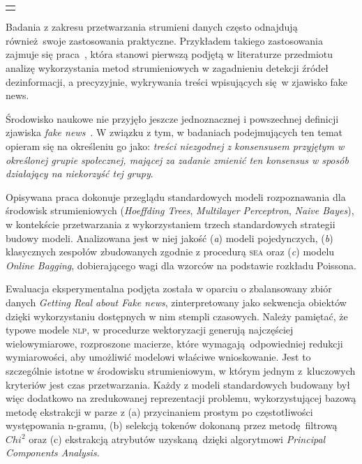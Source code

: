 {
\color{red}
\noindent\begin{tabular}{p{\textwidth}}
	\toprule &
\end{tabular}\vspace{-1em}
}
\noindent Badania z zakresu przetwarzania strumieni danych często odnajdują również swoje zastosowania praktyczne. Przykładem takiego zastosowania zajmuje się praca~, która stanowi pierwszą podjętą w literaturze przedmiotu analizę wykorzystania metod strumieniowych w zagadnieniu detekcji źródeł dezinformacji, a precyzyjnie, wykrywania treści wpisujących się w zjawisko fake news. 

Środowisko naukowe nie przyjęło jeszcze jednoznacznej i powszechnej definicji zjawiska \emph{fake news}~. W związku z tym, w badaniach podejmujących ten temat opieram się na określeniu go jako: \emph{treści niezgodnej z konsensusem przyjętym w określonej grupie społecznej, mającej za zadanie zmienić ten konsensus w sposób działający na niekorzyść tej grupy}.

Opisywana praca dokonuje przeglądu standardowych modeli rozpoznawania dla środowisk strumieniowych (\emph{Hoeffding Trees}, \emph{Multilayer Perceptron}, \emph{Naive Bayes}), w kontekście przetwarzania z wykorzystaniem trzech standardowych strategii budowy modeli. Analizowana jest w niej jakość (\emph{a}) modeli pojedynczych, (\emph{b}) klasycznych zespołów zbudowanych zgodnie z procedurą \textsc{sea} oraz (\emph{c}) modelu \emph{Online Bagging}, dobierającego wagi dla wzorców na podstawie rozkładu Poissona.

Ewaluacja eksperymentalna podjęta została w oparciu o zbalansowany zbiór danych \emph{Getting Real about Fake news}, zinterpretowany jako sekwencja obiektów dzięki wykorzystaniu dostępnych w nim stempli czasowych. Należy pamiętać, że typowe modele \textsc{nlp}, w procedurze wektoryzacji generują najczęściej wielowymiarowe, rozproszone macierze, które wymagają odpowiedniej redukcji wymiarowości, aby umożliwić modelowi właściwe wnioskowanie. Jest to szczególnie istotne w środowisku strumieniowym, w którym jednym z~kluczowych kryteriów jest czas przetwarzania. Każdy z modeli standardowych budowany był więc dodatkowo na zredukowanej reprezentacji problemu, wykorzystującej bazową metodę ekstrakcji w parze z (a) przycinaniem prostym po częstotliwości występowania n-gramu, (b) selekcją tokenów dokonaną przez metodę filtrową $Chi^2$ oraz (c) ekstrakcją atrybutów uzyskaną dzięki algorytmowi \emph{Principal Components Analysis}.

